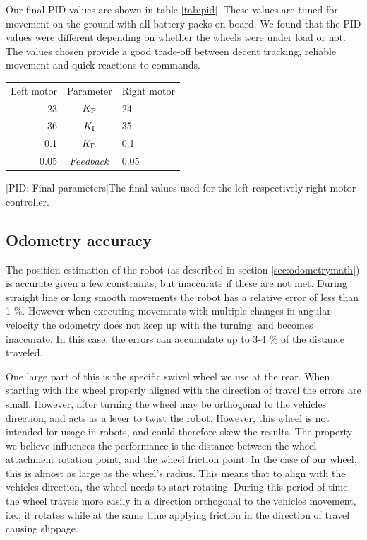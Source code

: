 \documentclass[11pt]{article}
\begin{document}
Our final PID values are shown in table \vref{tab:pid}. These values are tuned
for movement on the ground with all battery packs on board. We found that the
PID values were different depending on whether the wheels were under load or
not. The values chosen provide a good trade-off between decent tracking,
reliable movement and quick reactions to commands. \par
\begin{center}
  
\begin{tabular}{r|c|l}
  Left motor & Parameter & Right motor \\
  23  & ${K_{\textup{P}}}$ & 24 \\
  36  & ${K_{\textup{I}}}$ & 35 \\
  0.1  & ${K_{\textup{D}}}$ & 0.1 \\
  0.05  & $Feedback$ & 0.05 
\end{tabular}
[PID: Final parameters]{The final values used for the left
  respectively right motor controller. \label{tab:pid}}

\end{center}


\subsection{Odometry accuracy\label{sec:odometry}}
The position estimation of the robot (as described in section
\vref{sec:odometrymath}) is accurate given a few constraints, but inaccurate if
these are not met. During straight line or long smooth movements the robot has a
relative error of less than 1 \%. However when executing movements with multiple
changes in angular velocity the odometry does not keep up with the turning; and becomes
inaccurate. In this case, the errors can accumulate up to 3-4 \% of the distance
traveled. \par

One large part of this is the specific swivel wheel we use at the rear. When
starting with the wheel properly aligned with the direction of travel the errors
are small. However, after turning the wheel may be orthogonal to the vehicles
direction, and acts as a lever to twist the robot. However, this wheel is not
intended for usage in robots, and could therefore skew the results. The property
we believe influences the performance is the distance between the wheel
attachment rotation point, and the wheel friction point. In the case of our
wheel, this is almost as large as the wheel's radius. This means that to align
with the vehicles direction, the wheel needs to start rotating. During this
period of time, the wheel travels more easily in a direction orthogonal to the
vehicles movement, i.e., it rotates while at the same time applying friction in
the direction of travel causing slippage. \par
\end{document}
